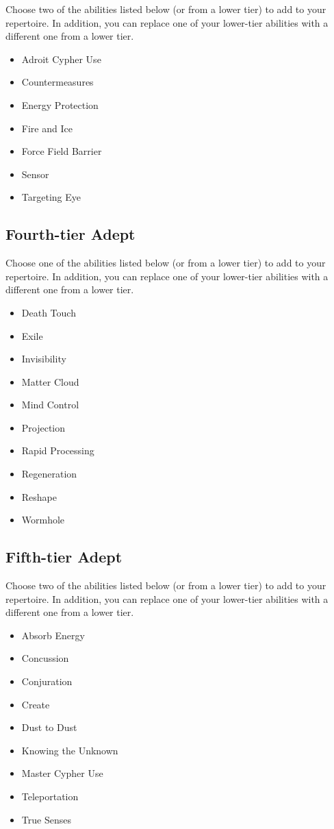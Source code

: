 \begin{multicols}{2}
Choose two of the abilities listed below (or from a lower tier) to add to your repertoire. In addition, you can replace one of your lower-tier abilities with a different one from a lower tier.

\begin{itemize}
\item Adroit Cypher Use
\item Countermeasures
\item Energy Protection
\item Fire and Ice
\item Force Field Barrier
\item Sensor
\item Targeting Eye
\end{itemize}

\subsection{Fourth-tier Adept}

Choose one of the abilities listed below (or from a lower tier) to add to your repertoire. In addition, you can replace one of your lower-tier abilities with a different one from a lower tier.

\begin{itemize}
\item Death Touch
\item Exile
\item Invisibility
\item Matter Cloud
\item Mind Control
\item Projection
\item Rapid Processing 
\item Regeneration
\item Reshape
\item Wormhole
\end{itemize}

\subsection{Fifth-tier Adept}

Choose two of the abilities listed below (or from a lower tier) to add to your repertoire. In addition, you can replace one of your lower-tier abilities with a different one from a lower tier.

\begin{itemize}
\item Absorb Energy
\item Concussion
\item Conjuration
\item Create
\item Dust to Dust 
\item Knowing the Unknown
\item Master Cypher Use
\item Teleportation
\item True Senses
\end{itemize}


\end{multicols}
